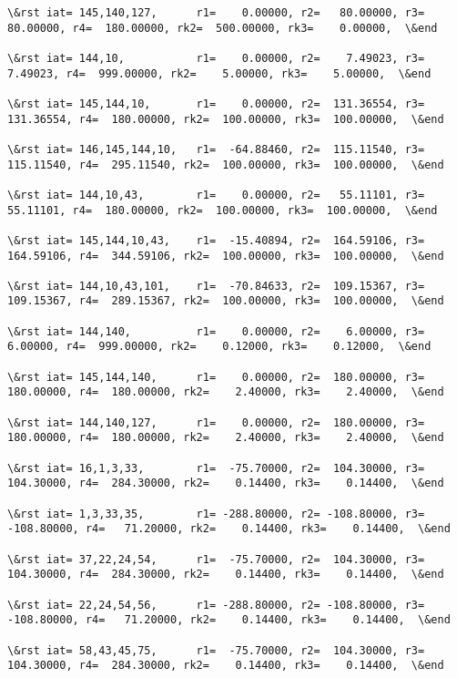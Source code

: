 \documentclass[11pt]{article}
\begin{document}
\begin{Verbatim}[commandchars=\\\{\}]
\&rst iat= 145,140,127,      r1=    0.00000, r2=   80.00000, r3=   80.00000, r4=  180.00000, rk2=  500.00000, rk3=    0.00000,  \&end

\&rst iat= 144,10,           r1=    0.00000, r2=    7.49023, r3=    7.49023, r4=  999.00000, rk2=    5.00000, rk3=    5.00000,  \&end

\&rst iat= 145,144,10,       r1=    0.00000, r2=  131.36554, r3=  131.36554, r4=  180.00000, rk2=  100.00000, rk3=  100.00000,  \&end

\&rst iat= 146,145,144,10,   r1=  -64.88460, r2=  115.11540, r3=  115.11540, r4=  295.11540, rk2=  100.00000, rk3=  100.00000,  \&end

\&rst iat= 144,10,43,        r1=    0.00000, r2=   55.11101, r3=   55.11101, r4=  180.00000, rk2=  100.00000, rk3=  100.00000,  \&end

\&rst iat= 145,144,10,43,    r1=  -15.40894, r2=  164.59106, r3=  164.59106, r4=  344.59106, rk2=  100.00000, rk3=  100.00000,  \&end

\&rst iat= 144,10,43,101,    r1=  -70.84633, r2=  109.15367, r3=  109.15367, r4=  289.15367, rk2=  100.00000, rk3=  100.00000,  \&end

\&rst iat= 144,140,          r1=    0.00000, r2=    6.00000, r3=    6.00000, r4=  999.00000, rk2=    0.12000, rk3=    0.12000,  \&end

\&rst iat= 145,144,140,      r1=    0.00000, r2=  180.00000, r3=  180.00000, r4=  180.00000, rk2=    2.40000, rk3=    2.40000,  \&end

\&rst iat= 144,140,127,      r1=    0.00000, r2=  180.00000, r3=  180.00000, r4=  180.00000, rk2=    2.40000, rk3=    2.40000,  \&end

\&rst iat= 16,1,3,33,        r1=  -75.70000, r2=  104.30000, r3=  104.30000, r4=  284.30000, rk2=    0.14400, rk3=    0.14400,  \&end

\&rst iat= 1,3,33,35,        r1= -288.80000, r2= -108.80000, r3= -108.80000, r4=   71.20000, rk2=    0.14400, rk3=    0.14400,  \&end

\&rst iat= 37,22,24,54,      r1=  -75.70000, r2=  104.30000, r3=  104.30000, r4=  284.30000, rk2=    0.14400, rk3=    0.14400,  \&end

\&rst iat= 22,24,54,56,      r1= -288.80000, r2= -108.80000, r3= -108.80000, r4=   71.20000, rk2=    0.14400, rk3=    0.14400,  \&end

\&rst iat= 58,43,45,75,      r1=  -75.70000, r2=  104.30000, r3=  104.30000, r4=  284.30000, rk2=    0.14400, rk3=    0.14400,  \&end


\end{Verbatim}
\end{document}

